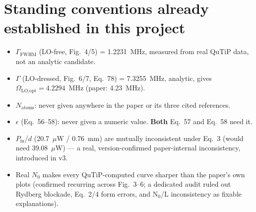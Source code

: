 \documentclass[11pt]{article}
\begin{document}
\section{Standing conventions already established in this project}
\begin{itemize}
\item $\Gamma_\text{FWHM}$ (LO-free, Fig.~4/5) = 1.2231~MHz, measured
from real QuTiP data, not an analytic candidate.
\item $\Gamma$ (LO-dressed, Fig.~6/7, Eq.~78) = 7.3255~MHz, analytic,
gives $\Omega_\text{LO,opt}=4.2294$~MHz (paper: 4.23~MHz).
\item $N_\text{atoms}$: never given anywhere in the paper or its three
cited references.
\item $\epsilon$ (Eq.~56--58): never given a numeric value. \textbf{Both}
Eq.~57 and Eq.~58 need it.
\item $P_\text{in}$/$d$ (20.7~$\mu$W / 0.76~mm) are mutually
inconsistent under Eq.~3 (would need 39.08~$\mu$W) --- a real,
version-confirmed paper-internal inconsistency, introduced in v3.
\item Real $N_0$ makes every QuTiP-computed curve sharper than the
paper's own plots (confirmed recurring across Fig.~3--6; a dedicated
audit ruled out Rydberg blockade, Eq.~2/4 form errors, and N$_0$/L
inconsistency as fixable explanations).
\end{itemize}
\end{document}
